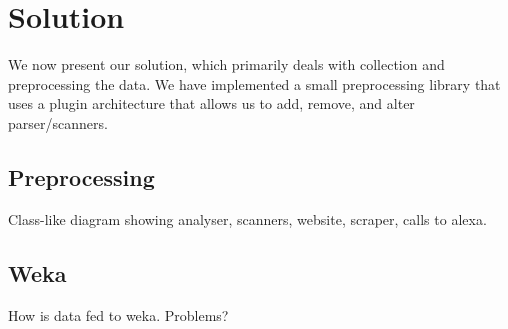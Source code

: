 \section{Solution}
\label{sec:solution}
We now present our solution, which primarily deals with collection and preprocessing the data. We have implemented a small preprocessing library that uses a plugin architecture that allows us to add, remove, and alter parser/scanners.

\subsection{Preprocessing}
\label{subsec:preprocessing}
Class-like diagram showing analyser, scanners, website, scraper, calls to alexa.

\subsection{Weka}
\label{subsec:weka}
How is data fed to weka. Problems?


